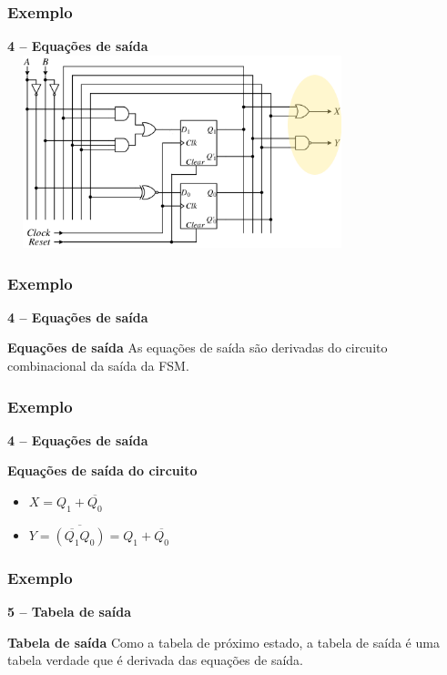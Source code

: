 \documentclass{beamer}
\begin{document}
\begin{frame}
  \frametitle{Exemplo}
  \textbf{4 – Equações de saída}
  \includegraphics[height = 2.2in, width = 4in]{images/EXEMPLO_ANALISE_4.png}
\end{frame}

\begin{frame}
  \frametitle{Exemplo}
  \textbf{4 – Equações de saída}
   \begin{block}{\textbf{Equações de saída}}
    As equações de saída são derivadas do circuito combinacional da saída da 
    FSM.
   \end{block}
\end{frame}

\begin{frame}
  \frametitle{Exemplo}
  \textbf{4 – Equações de saída}
   \begin{block}{\textbf{Equações de saída do circuito}}
     \begin{itemize}
      \item $X = Q_1 + \overline{Q_0}$
      \item $Y = \overline{(\overline{Q_1}Q_0)} = Q_1 + \overline{Q_0} $ 
     \end{itemize}
   \end{block}
\end{frame}

\begin{frame}
  \frametitle{Exemplo}
  \textbf{5 – Tabela de saída}
   \begin{block}{\textbf{Tabela de saída}}
    Como a tabela de próximo estado, a tabela de saída é uma tabela verdade que 
    é derivada das equações de saída.
   \end{block}
\end{frame}
\end{document}
